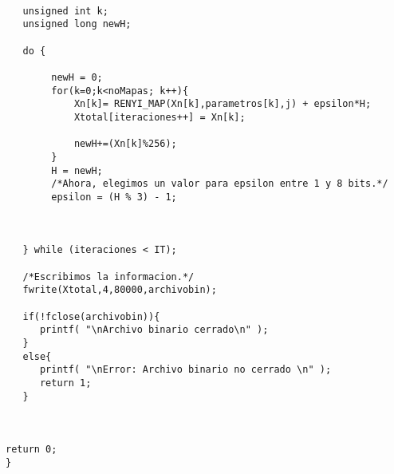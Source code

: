 \documentclass[12pt,3p]{elsarticle}
\begin{document}
\begin{verbatim}
      
   unsigned int k;
   unsigned long newH;

   do {
        
        newH = 0;
        for(k=0;k<noMapas; k++){            
            Xn[k]= RENYI_MAP(Xn[k],parametros[k],j) + epsilon*H;
            Xtotal[iteraciones++] = Xn[k];
             
            newH+=(Xn[k]%256);      
        }
        H = newH;
        /*Ahora, elegimos un valor para epsilon entre 1 y 8 bits.*/
        epsilon = (H % 3) - 1;
     
 

   } while (iteraciones < IT);

   /*Escribimos la informacion.*/
   fwrite(Xtotal,4,80000,archivobin); 

   if(!fclose(archivobin)){
      printf( "\nArchivo binario cerrado\n" );
   }
   else{
      printf( "\nError: Archivo binario no cerrado \n" );
      return 1;
   }
   
   

return 0;
}
\end{verbatim}
\end{document}
